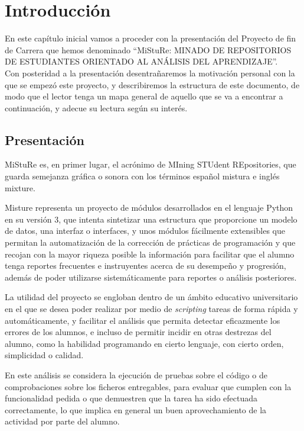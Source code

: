 \chapter{Introducción}
\label{sec:intro}

En este capítulo inicial vamos a proceder con la presentación del Proyecto de fin de Carrera que hemos denominado “MiStuRe: MINADO DE REPOSITORIOS DE ESTUDIANTES ORIENTADO AL ANÁLISIS DEL APRENDIZAJE”.\\


Con posteridad a la presentación desentrañaremos la motivación personal con la que se empezó este proyecto, y describiremos la estructura de este documento, de modo que el lector tenga un mapa general de aquello que se va a encontrar a continuación, y adecue su lectura según su interés.



\section{Presentación}

MiStuRe es, en primer lugar, el acrónimo de MIning STUdent REpositories, que guarda semejanza gráfica o sonora con los términos español mistura e inglés mixture.


Misture representa un proyecto de módulos desarrollados en el lenguaje Python en su versión 3, que intenta sintetizar una estructura que proporcione un modelo de datos, una interfaz o interfaces, y unos módulos fácilmente extensibles que permitan la automatización de la corrección de prácticas de programación y que recojan con la mayor riqueza posible la información para facilitar que el alumno tenga reportes frecuentes e instruyentes acerca de su desempeño y progresión, además de poder utilizarse sistemáticamente para reportes o análisis posteriores.


La utilidad del proyecto se engloban dentro de un ámbito educativo universitario en el que se desea poder realizar por medio de \textit{scripting} tareas de forma rápida y automáticamente, y facilitar el análisis que permita detectar eficazmente los errores de los alumnos, e incluso de permitir incidir en otras destrezas del alumno, como la habilidad programando en cierto lenguaje, con cierto orden, simplicidad o calidad.


En este análisis se considera la ejecución de pruebas sobre el código o de comprobaciones sobre los ficheros entregables, para evaluar que cumplen con la funcionalidad pedida o que demuestren que la tarea ha sido efectuada correctamente, lo que implica en general un buen aprovechamiento de la actividad por parte del alumno.


